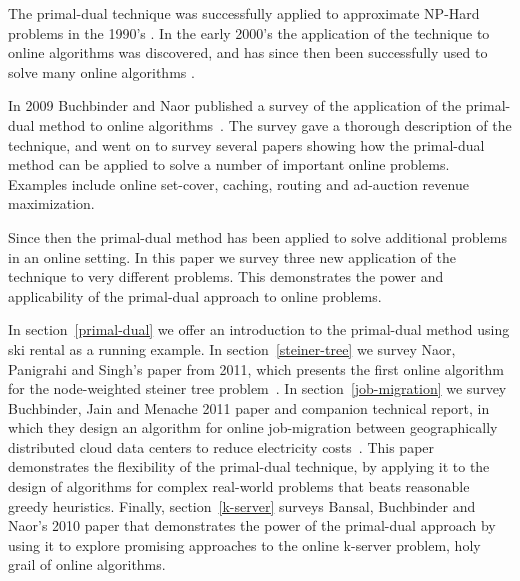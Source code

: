 The primal-dual technique was successfully applied to approximate NP-Hard problems in the 1990's .
In the early 2000's the application of the technique to online algorithms was discovered, and has since then been successfully used to solve many online algorithms .

In 2009 Buchbinder and Naor published a survey of the application of the primal-dual method to online algorithms~\cite{buchbinder09:survey}.
The survey gave a thorough description of the technique, and went on to survey several papers showing how the primal-dual method can be applied to solve a number of important online problems. 
Examples include online set-cover, caching, routing and ad-auction revenue maximization.

Since then the primal-dual method has been applied to solve additional problems in an online setting.
In this paper we survey three new application of the technique to very different problems.
This demonstrates the power and applicability of the primal-dual approach to online problems.

In section~\ref{primal-dual} we offer an introduction to the primal-dual method using ski rental as a running example.
In section~\ref{steiner-tree} we survey Naor, Panigrahi and Singh's paper from 2011, which presents the first online algorithm for the node-weighted steiner tree problem~\cite{naor11:node-weighted-steiner-tree}.
In section~\ref{job-migration} we survey Buchbinder, Jain and Menache 2011 paper and companion technical report, in which they design an algorithm for online job-migration between geographically distributed cloud data centers to reduce electricity costs~\cite{buchbinder11:job-migration,buchbinder11:job-migration-techreport}.
This paper demonstrates the flexibility of the primal-dual technique, by applying it to the design of algorithms for complex real-world problems that beats reasonable greedy heuristics.
Finally, section~\ref{k-server} surveys Bansal, Buchbinder and Naor's 2010 paper that demonstrates the power of the primal-dual approach by using it to explore promising approaches to the online k-server problem, holy grail of online algorithms.
